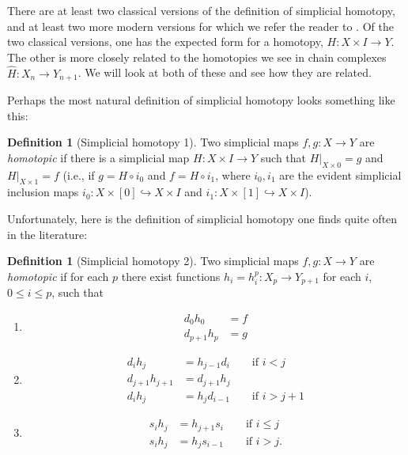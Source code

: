 \documentclass[12pt]{article}
\theoremstyle{plain}
\theoremstyle{definition}
\newtheorem{definition}[theorem]{Definition}
\theoremstyle{remark}
\newcommand{\into}{\hookrightarrow}
\begin{document}
There are at least two classical versions of the definition of simplicial homotopy, and at least two more modern versions for which we refer the reader to \cite{GoeJar}. Of the two classical versions, one has the expected form for a homotopy, $H\colon X\times I\to Y$. The other is more closely related to the homotopies we see in chain complexes $\widehat H\colon X_n\to Y_{n+1}$. We will look at both of these and see how they are related.

Perhaps the most natural definition of simplicial homotopy  looks something like  this:

\begin{definition}[Simplicial homotopy 1] 
Two simplicial maps $f,g\colon X\to Y$ are \emph{homotopic} if there is a simplicial map $H\colon X\times I\to Y$ such that $H|_{X\times 0}=g$ and $H|_{X\times 1}=f$ (i.e., if $g=H\circ i_0$ and $f=H\circ i_1$, where $i_0,i_1$ are the evident simplicial inclusion maps $i_0\colon X\times [0]\into X\times I$ and $i_1\colon X\times [1]\into X\times I$). 
\end{definition}



Unfortunately, here is the definition of simplicial homotopy one finds quite often in the literature:


\begin{definition}[Simplicial homotopy 2] \label{D: comb hom}
Two simplicial maps $f,g\colon X\to Y$ are \emph{homotopic} if for each $p$ there exist functions $h_i=h_i^p\colon X_p\to Y_{p+1}$ for each $i$, $0\leq i\leq p$, such that 
\begin{enumerate}
\item \begin{align*}d_0h_0&=f \\d_{p+1}h_p&=g \end{align*}
\item \begin{align*}
d_ih_j&=h_{j-1}d_i \qquad\text{if $i<j$}\\
d_{j+1}h_{j+1}&=d_{j+1}h_j\\
d_ih_j&=h_{j}d_{i-1} \qquad\text{if $i>j+1$}
\end{align*}
\item \begin{align*}
s_ih_j&=h_{j+1}s_i \qquad\text{if $i\leq j$}\\
s_ih_j&=h_{j}s_{i-1} \qquad\text{if $i>j$}.
\end{align*}
\end{enumerate}
\end{definition}
\end{document}
